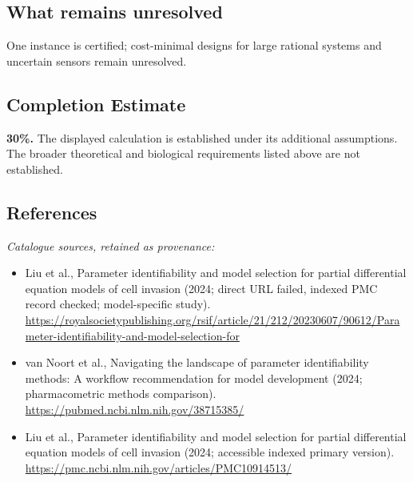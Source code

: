 \documentclass[11pt]{article}
\begin{document}
\subsection{What remains unresolved}
One instance is certified; cost-minimal designs for large rational systems and uncertain sensors remain unresolved.
\subsection{Completion Estimate}
\textbf{30\%.} The displayed calculation is established under its additional assumptions. The broader theoretical and biological requirements listed above are not established.
\subsection{References}
\noindent\emph{Catalogue sources, retained as provenance:}
\begin{itemize}
\item Liu et al., Parameter identifiability and model selection for partial differential equation models of cell invasion (2024; direct URL failed, indexed PMC record checked; model-specific study). \url{https://royalsocietypublishing.org/rsif/article/21/212/20230607/90612/Parameter-identifiability-and-model-selection-for}
\item van Noort et al., Navigating the landscape of parameter identifiability methods: A workflow recommendation for model development (2024; pharmacometric methods comparison). \url{https://pubmed.ncbi.nlm.nih.gov/38715385/}
\item Liu et al., Parameter identifiability and model selection for partial differential equation models of cell invasion (2024; accessible indexed primary version). \url{https://pmc.ncbi.nlm.nih.gov/articles/PMC10914513/}
\end{itemize}
\clearpage


\appendix
\end{document}
